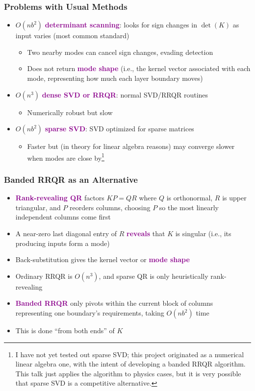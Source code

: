 \documentclass[xcolor=svgnames]{beamer}
\renewcommand{\emph}[1]{\textcolor{DarkMagenta}{\textbf{#1}}}
\begin{document}
\begin{frame}
    \frametitle{Problems with Usual Methods}
    \begin{itemize}
        \item $O(nb^2)$ \emph{determinant scanning}: looks for sign changes in $\det(K)$ as input varies (most common standard)
        \begin{itemize}
            \item Two nearby modes can cancel sign changes, evading detection\vfill
            \item Does not return \emph{mode shape} (i.e., the kernel vector associated with each mode, representing how much each layer boundary moves)
        \end{itemize}\vfill
        \item $O(n^3)$ \emph{dense SVD or RRQR}: normal SVD/RRQR routines
        \begin{itemize}
            \item Numerically robust but slow
        \end{itemize}\vfill
        \item $O(nb^2)$ \emph{sparse SVD}: SVD optimized for sparse matrices
        \begin{itemize}
            \item Faster but (in theory for linear algebra reasons) may converge slower when modes are close by\footnote{I have not yet tested out sparse SVD; this project originated as a numerical linear algebra one, with the intent of developing a banded RRQR algorithm. This talk just applies the algorithm to physics cases, but it is very possible that sparse SVD is a competitive alternative.}
        \end{itemize}\vfill
    \end{itemize}
\end{frame}

\begin{frame}
    \frametitle{Banded RRQR as an Alternative}
    \begin{itemize}
        \item \emph{Rank-revealing QR} factors $KP = QR$ where $Q$ is orthonormal, $R$ is upper triangular, and $P$ reorders columns, choosing $P$ so the most linearly independent columns come first\vfill
        \item A near-zero last diagonal entry of $R$ \emph{reveals} that $K$ is singular (i.e., its producing inputs form a mode)\vfill
        \item Back-substitution gives the kernel vector or \emph{mode shape}\vfill
        \item Ordinary RRQR is $O(n^3)$, and sparse QR is only heuristically rank-revealing\vfill
        \item \emph{Banded RRQR} only pivots within the current block of columns representing one boundary's requirements, taking $O(nb^2)$ time\vfill
        \item This is done ``from both ends'' of $K$\vfill
    \end{itemize}
\end{frame}
\end{document}
